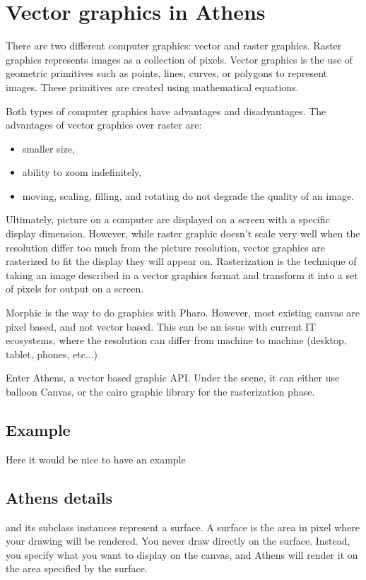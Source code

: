 \documentclass[10pt,twoside,english]{_support/latex/sbabook/sbabook}
\begin{document}
\frontmatter
\pagestyle{plain}

\tableofcontents*
\clearpage\listoffigures

\mainmatter


\chapter{Vector graphics in Athens}
There are two different computer graphics: vector and raster graphics.
Raster graphics represents images as a collection of pixels. Vector graphics
is the use of geometric primitives such as points, lines, curves, or polygons
to represent images. These primitives are created using mathematical equations.

Both types of computer graphics have advantages and disadvantages.
The advantages of vector graphics over raster are:

\begin{itemize}
    \item smaller size,
    \item ability to zoom indefinitely,
    \item moving, scaling, filling, and rotating do not degrade the quality of an image.
\end{itemize}

Ultimately, picture on a computer are displayed on a screen with a specific
display dimension. However, while raster graphic doesn't scale very well when
the resolution differ too much from the picture resolution, vector graphics
are rasterized to fit the display they will appear on. Rasterization is the
technique of taking an image described in a vector graphics format and
transform it into a set of pixels for output on a screen.

Morphic is the way to do graphics with Pharo.
However, most existing canvas are pixel based, and not vector based.
This can be an issue with current IT ecosystems, where the resolution can differ from machine to machine (desktop, tablet, phones, etc...)

Enter Athens, a vector based graphic API. Under the scene, it can either use
balloon Canvas, or the cairo graphic library for the rasterization phase.

\section{Example}
Here it would be nice to have an example

\section{Athens details}
 and its subclass  instances represent a surface.
A surface is the area in pixel where your drawing will be rendered.
You  never draw directly on the surface.
Instead, you specify what you want to display on the canvas, and Athens will render it on the area specified by the surface.
\end{document}
